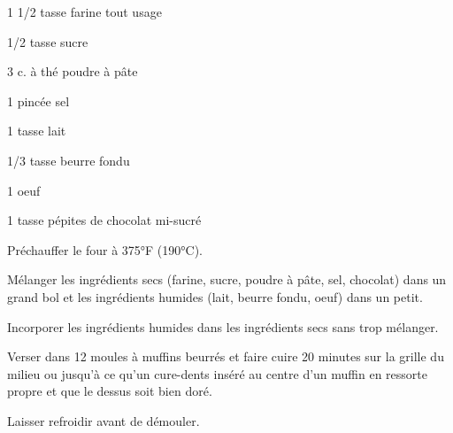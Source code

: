 %
%   
%   
%   
%




\totaltime{}


\begin{ingredients}
    \item 1 1/2 tasse farine tout usage
    \item 1/2 tasse sucre
    \item 3 c. à thé poudre à pâte
    \item 1 pincée sel
    \item 1 tasse lait
    \item 1/3 tasse beurre fondu
    \item 1 oeuf
    \item 1 tasse pépites de chocolat mi-sucré
\end{ingredients}

\begin{steps}
    \item Préchauffer le four à 375°F (190°C).
    \item Mélanger les ingrédients secs (farine, sucre, poudre à pâte, sel, chocolat) dans un grand bol et les ingrédients humides (lait, beurre fondu, oeuf) dans un petit.
    \item Incorporer les ingrédients humides dans les ingrédients secs sans trop mélanger.
    \item Verser dans 12 moules à muffins beurrés et faire cuire 20 minutes sur la grille du milieu ou jusqu'à ce qu'un cure-dents inséré au centre d'un muffin en ressorte propre et que le dessus soit bien doré.
    \item Laisser refroidir avant de démouler.
\end{steps}
